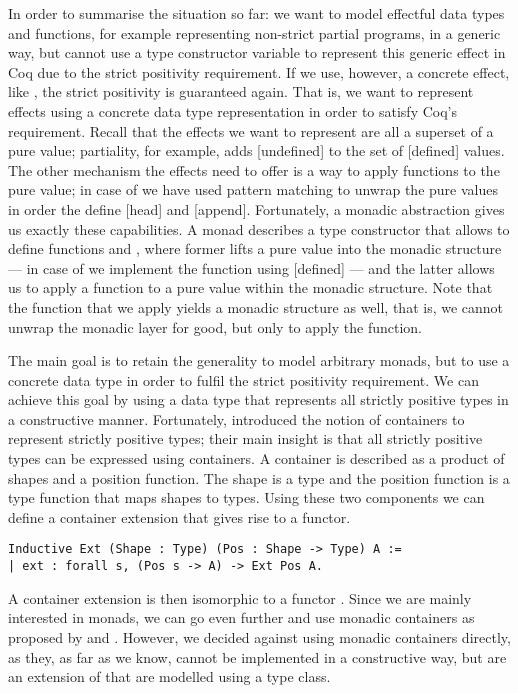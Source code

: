 In order to summarise the situation so far: we want to model effectful
data types and functions, for example representing non-strict partial
programs, in a generic way, but cannot use a type constructor variable
to represent this generic effect in Coq due to the strict positivity
requirement.
If we use, however, a concrete effect, like , the strict
positivity is guaranteed again.
That is, we want to represent effects using a concrete data type
representation in order to satisfy Coq's requirement.
Recall that the effects we want to represent are all a superset of a
pure value; partiality, for example, adds [undefined] to the set of
[defined] values.
The other mechanism the effects need to offer is a way to apply
functions to the pure value; in case of  we have used pattern
matching to unwrap the pure values in order the define [head] and
[append].
Fortunately, a monadic abstraction gives us exactly these
capabilities.
A monad describes a type constructor  that allows to define
functions  and , where former lifts a pure value into the monadic structure
--- in case of  we implement the function using [defined] ---
and the latter allows us to apply a function to a pure value within
the monadic structure.
Note that the function that we apply yields a monadic structure as
well, that is, we cannot unwrap the monadic layer for good, but only
to apply the function.

The main goal is to retain the generality to model arbitrary monads,
but to use a concrete data type in order to fulfil the strict
positivity requirement.
We can achieve this goal by using a data type that represents all
strictly positive types in a constructive manner.
Fortunately, \citet{abbott2003categories} introduced the notion of
containers to represent strictly positive types; their main insight is
that all strictly positive types can be expressed using containers.
A container is described as a product of shapes and a position function.
The shape is a type  and the position function  is a type
function that maps shapes to types.
Using these two components we can define a container extension that
gives rise to a functor.

\begin{verbatim}
Inductive Ext (Shape : Type) (Pos : Shape -> Type) A :=
| ext : forall s, (Pos s -> A) -> Ext Pos A.
\end{verbatim}

A container extension  is then isomorphic to a functor
.
Since we are mainly interested in monads, we can go even further and
use monadic containers as proposed by \citet{altenkirch2017monadic} and
\citet{uustalu2017partiality}.
However, we decided against using monadic containers directly, as
they, as far as we know, cannot be implemented in a constructive way,
but are an extension of  that are modelled using a type
class.


